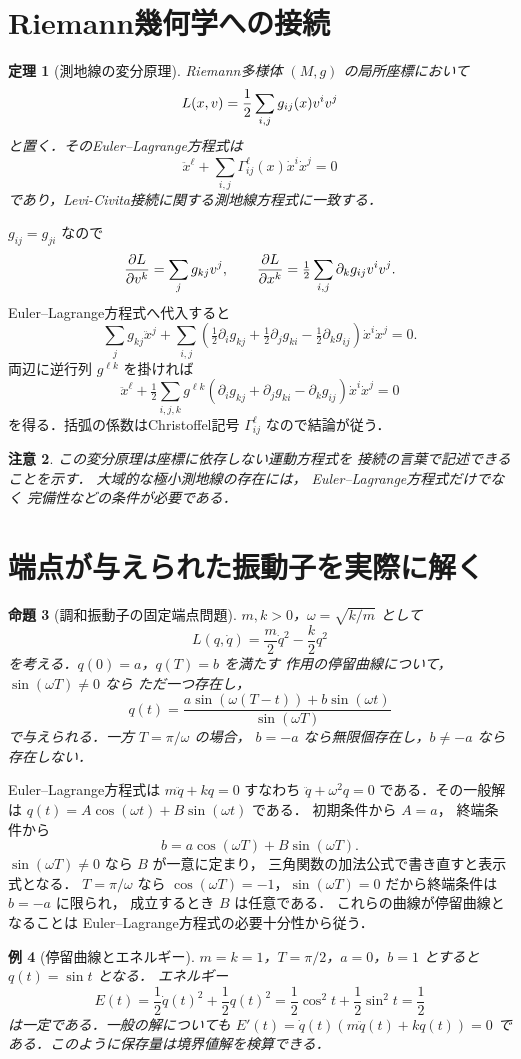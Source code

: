 \documentclass[a5paper,10pt,onecolumn]{jsarticle}
\makeatletter
\theoremstyle{mathnotetheorem}
\newtheorem{theorem}{定理}[section]
\newtheorem{proposition}[theorem]{命題}
\newtheorem{example}[theorem]{例}
\newtheorem{remark}[theorem]{注意}
\renewcommand{\proofname}{証明}
\renewenvironment{proof}[1][\proofname]{%
  \par\pushQED{\qed}\normalfont\topsep4\p@\@plus2\p@\relax
  \trivlist\item[\hskip\labelsep\bfseries #1]\ignorespaces
}{\popQED\endtrivlist\@endpefalse}
\makeatother
\begin{document}
\section{Riemann幾何学への接続}
\begin{theorem}[測地線の変分原理]
Riemann多様体 $(M,g)$ の局所座標において
\[
 L(x,v)={1\over2}\sum_{i,j}g_{ij}(x)v^iv^j
\]
と置く．そのEuler--Lagrange方程式は
\[
 \ddot x^\ell+\sum_{i,j}\Gamma^\ell_{ij}(x)
 \dot x^i\dot x^j=0
\]
であり，Levi-Civita接続に関する測地線方程式に一致する．
\end{theorem}
\begin{proof}
$g_{ij}=g_{ji}$ なので
\[
 {\partial L\over\partial v^k}=\sum_jg_{kj}v^j,\qquad
 {\partial L\over\partial x^k}
 =\tfrac12\sum_{i,j}\partial_k g_{ij}v^iv^j.
\]
Euler--Lagrange方程式へ代入すると
\[
 \sum_jg_{kj}\ddot x^j+
 \sum_{i,j}\left(
 \tfrac12\partial_i g_{kj}
 +\tfrac12\partial_jg_{ki}
 -\tfrac12\partial_kg_{ij}\right)
 \dot x^i\dot x^j=0.
\]
両辺に逆行列 $g^{\ell k}$ を掛ければ
\[
 \ddot x^\ell+\tfrac12\sum_{i,j,k}g^{\ell k}
 (\partial_i g_{kj}+\partial_jg_{ki}-\partial_kg_{ij})
 \dot x^i\dot x^j=0
\]
を得る．括弧の係数はChristoffel記号
$\Gamma^\ell_{ij}$ なので結論が従う．
\end{proof}
\begin{remark}
この変分原理は座標に依存しない運動方程式を
接続の言葉で記述できることを示す．
大域的な極小測地線の存在には，
Euler--Lagrange方程式だけでなく
完備性などの条件が必要である．
\end{remark}

\section{端点が与えられた振動子を実際に解く}
\begin{proposition}[調和振動子の固定端点問題]
$m,k>0$，$\omega=\sqrt{k/m}$ として
\[
 L(q,\dot q)=\frac m2\dot q^2-\frac k2q^2
\]
を考える．$q(0)=a$，$q(T)=b$ を満たす
作用の停留曲線について，$\sin(\omega T)\ne0$ なら
ただ一つ存在し，
\[
 q(t)=
 \frac{a\sin(\omega(T-t))+b\sin(\omega t)}
      {\sin(\omega T)}
\]
で与えられる．一方 $T=\pi/\omega$ の場合，
$b=-a$ なら無限個存在し，$b\ne-a$ なら存在しない．
\end{proposition}
\begin{proof}
Euler--Lagrange方程式は
$m\ddot q+kq=0$ すなわち
$\ddot q+\omega^2q=0$ である．その一般解は
$q(t)=A\cos(\omega t)+B\sin(\omega t)$ である．
初期条件から $A=a$，
終端条件から
\[
 b=a\cos(\omega T)+B\sin(\omega T).
\]
$\sin(\omega T)\ne0$ なら $B$ が一意に定まり，
三角関数の加法公式で書き直すと表示式となる．
$T=\pi/\omega$ なら
$\cos(\omega T)=-1$，$\sin(\omega T)=0$
だから終端条件は $b=-a$ に限られ，
成立するとき $B$ は任意である．
これらの曲線が停留曲線となることは
Euler--Lagrange方程式の必要十分性から従う．
\end{proof}
\begin{example}[停留曲線とエネルギー]
$m=k=1$，$T=\pi/2$，$a=0$，$b=1$
とすると $q(t)=\sin t$ となる．
エネルギー
\[
 E(t)=\frac12\dot q(t)^2+\frac12q(t)^2
     =\frac12\cos^2t+\frac12\sin^2t
     =\frac12
\]
は一定である．一般の解についても
$E'(t)=\dot q(t)(m\ddot q(t)+kq(t))=0$
である．このように保存量は境界値解を検算できる．
\end{example}
\end{document}
